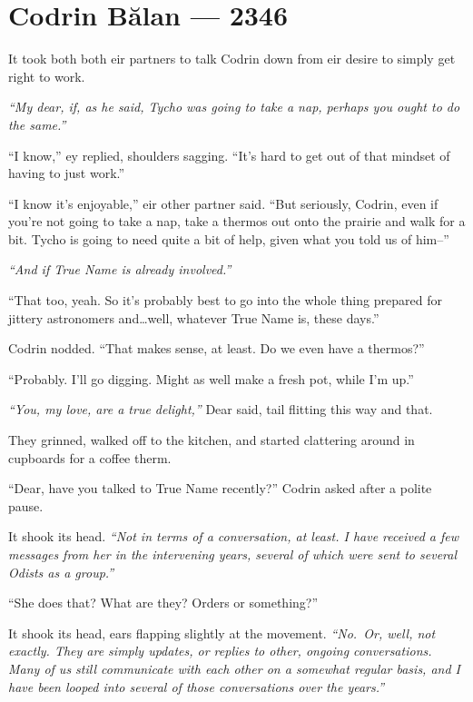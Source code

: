 \hypertarget{codrin-bux103lan-2346}{%
\chapter{Codrin Bălan — 2346}\label{codrin-bux103lan-2346}}

It took both both eir partners to talk Codrin down from eir desire to simply get right to work.

\emph{``My dear, if, as he said, Tycho was going to take a nap, perhaps you ought to do the same.''}

``I know,'' ey replied, shoulders sagging. ``It's hard to get out of that mindset of having to just work.''

``I know it's enjoyable,'' eir other partner said. ``But seriously, Codrin, even if you're not going to take a nap, take a thermos out onto the prairie and walk for a bit. Tycho is going to need quite a bit of help, given what you told us of him--''

\emph{``And if True Name is already involved.''}

``That too, yeah. So it's probably best to go into the whole thing prepared for jittery astronomers and\ldots well, whatever True Name is, these days.''

Codrin nodded. ``That makes sense, at least. Do we even have a thermos?''

``Probably. I'll go digging. Might as well make a fresh pot, while I'm up.''

\emph{``You, my love, are a true delight,''} Dear said, tail flitting this way and that.

They grinned, walked off to the kitchen, and started clattering around in cupboards for a coffee therm.

``Dear, have you talked to True Name recently?'' Codrin asked after a polite pause.

It shook its head. \emph{``Not in terms of a conversation, at least. I have received a few messages from her in the intervening years, several of which were sent to several Odists as a group.''}

``She does that? What are they? Orders or something?''

It shook its head, ears flapping slightly at the movement. \emph{``No.~Or, well, not exactly. They are simply updates, or replies to other, ongoing conversations. Many of us still communicate with each other on a somewhat regular basis, and I have been looped into several of those conversations over the years.''}

